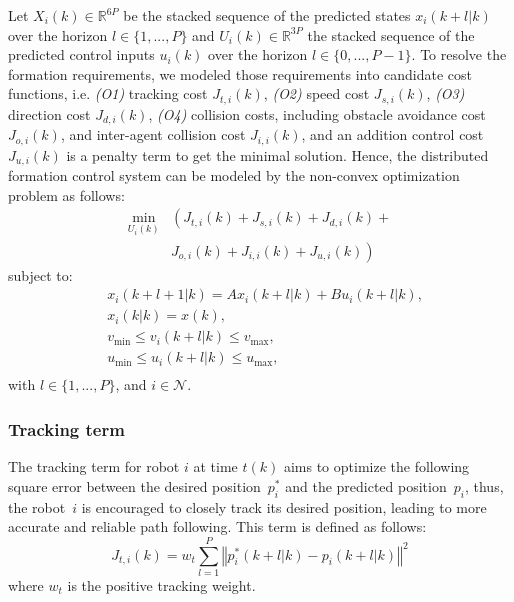 Let $X_i(k)\in\mathbb{R}^{6P}$ be the stacked sequence of the predicted states $x_i(k+l|k)$ over the horizon $l\in\{1,...,P\}$ and $U_i(k)\in\mathbb{R}^{3P}$ the stacked sequence of the predicted control inputs $u_i(k)$ over the horizon $l\in\{0,...,P-1\}$. To resolve the formation requirements, we modeled those requirements into candidate cost functions, i.e. \textit{(O1)} tracking cost $J_{t,i}(k)$, \textit{(O2)} speed cost $J_{s,i}(k)$, \textit{(O3)} direction cost $J_{d,i}(k)$, \textit{(O4)} collision costs, including obstacle avoidance cost $J_{o,i}(k)$, and inter-agent collision cost $J_{i,i}(k)$, and an addition control cost $J_{u,i}(k)$ is a penalty term to get the minimal solution. Hence, the distributed formation control system can be modeled by the non-convex optimization problem as follows:
\begin{equation}
\begin{aligned}
    \min_{U_i(k)}&\left(J_{t,i}(k)+J_{s,i}(k)+J_{d,i}(k)+\right.\\
    &\left.J_{o,i}(k)+J_{i,i}(k)+J_{u,i}(k)\right)
\end{aligned}
    \label{eqn:J}
\end{equation}
subject to:
\begin{equation}
    \begin{aligned}
        &x_i(k+l+1|k)=Ax_i(k+l|k)+Bu_i(k+l|k),\\
        &x_i(k|k)=x(k),\\
        &v_\text{min}\leq v_i(k+l|k)\leq v_\text{max},\\
        &u_\text{min}\leq u_i(k+l|k)\leq u_\text{max},\\
    \end{aligned}
    \label{eqn:constraints}
\end{equation}
with $l\in\{1,...,P\}$, and $i\in\mathcal{N}$.

\subsubsection{Tracking term}\label{sec:tracking_term}
The tracking term for robot $i$ at time $t(k)$ aims to optimize the following square error between the desired position~$p_i^*$ and the  predicted position~$p_i$, thus, the robot~$i$ is encouraged to closely track its desired position, leading to more accurate and reliable path following. This term is defined as follows:
\begin{equation}
    J_{t,i}(k)=w_t\sum_{l=1}^P{\left\Vert p^*_i(k+l|k)-p_i(k+l|k)\right\Vert^2}
\end{equation}
where $w_t$ is the positive tracking weight.


